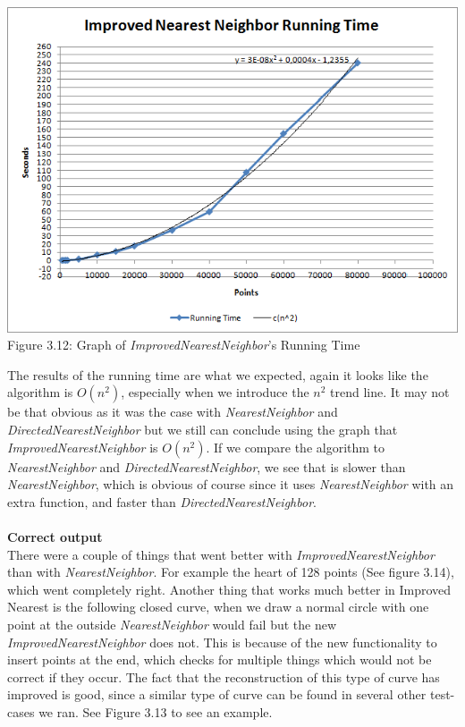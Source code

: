           \begin{center}
            \includegraphics[scale = 0.5]{3ImprovedNearestNeighbor/innRuntimeGraph.png}\\
            Figure 3.12: Graph of \textit{ImprovedNearestNeighbor}'s Running Time
            \label{fig:inn_runnningtime}
          \end{center}

      \noindent The results of the running time are what we expected, again it looks like the algorithm is $O(n^2)$, especially when we introduce the $n^2$ trend line. It may not be that obvious as it was the case with \textit{NearestNeighbor} and \textit{DirectedNearestNeighbor} but we still can conclude using the graph that \textit{ImprovedNearestNeighbor} is $O(n^2)$.
      If we compare the algorithm to \textit{NearestNeighbor} and \textit{DirectedNearestNeighbor}, we see that is slower than \textit{NearestNeighbor}, which is obvious of course since it uses \textit{NearestNeighbor} with an extra function, and faster than \textit{DirectedNearestNeighbor}.\\\\
    \textbf{Correct output}\\
    There were a couple of things that went better with \textit{ImprovedNearestNeighbor} than with \textit{NearestNeighbor}. For example the heart of 128 points (See figure 3.14), which went completely right. Another thing that works much better in Improved Nearest is the following closed curve, when we draw a normal circle with one point at the outside \textit{NearestNeighbor} would fail but the new \textit{ImprovedNearestNeighbor} does not. This is because of the new functionality to insert points at the end, which checks for multiple things which would not be correct if they occur. The fact that the reconstruction of this type of curve has improved is good, since a similar type of curve can be found in several other test-cases we ran.
    See Figure 3.13 to see an example.\\

